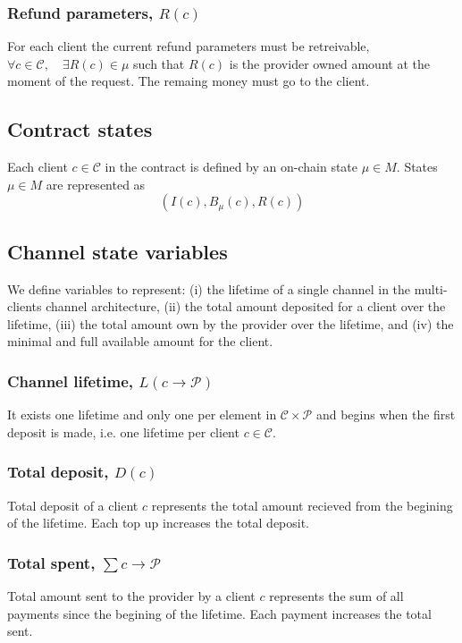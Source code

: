 \documentclass{llncs}
\begin{document}
\subsubsection{Refund parameters, $R(c)$} For each client the current refund parameters must be retreivable, $\forall c \in \mathcal{C}, \quad \exists R(c) \in \mu$ such that $R(c)$ is the provider owned amount at the moment of the request. The remaing money must go to the client.

\subsection{Contract states} Each client $c \in \mathcal{C}$ in the contract is defined by an on-chain state $\mu \in M$. States $\mu \in M$ are represented as
$$(I(c), B_\mu(c), R(c))$$

\subsection{Channel state variables} We define variables to represent: (i) the lifetime of a single channel in the multi-clients channel architecture, (ii) the total amount deposited for a client over the lifetime, (iii) the total amount own by the provider over the lifetime, and (iv) the minimal and full available amount for the client.

\subsubsection{Channel lifetime, $L(c \rightarrow \mathcal{P})$} It exists one lifetime and only one per element in $\mathcal{C} \times \mathcal{P}$ and begins when the first deposit is made, i.e. one lifetime per client $c \in \mathcal{C}$.

\subsubsection{Total deposit, $D(c)$} Total deposit of a client $c$ represents the total amount recieved from the begining of the lifetime. Each top up increases the total deposit.

\subsubsection{Total spent, $\sum c \rightarrow \mathcal{P}$} Total amount sent to the provider by a client $c$ represents the sum of all payments since the begining of the lifetime. Each payment increases the total sent.
\end{document}
